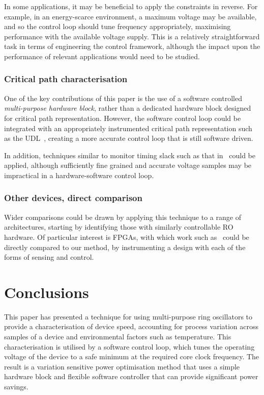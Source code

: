 \documentclass[a4paper,twocolumn,DIV=16]{scrartcl}
\begin{document}
In some applications, it may be beneficial to apply the constraints in reverse.
For example, in an energy-scarce environment, a maximum voltage may be
available, and so the control loop should tune frequency appropriately,
maximising performance with the available voltage supply. This is a relatively
straightforward task in terms of engineering the control framework, although the
impact upon the performance of relevant applications would need to be studied.

\subsubsection*{Critical path characterisation}

One of the key contributions of this paper is the use of a software controlled
\emph{multi-purpose hardware block}, rather than a dedicated hardware block
designed for critical path representation. However, the software control loop
could be integrated with an appropriately instrumented critical path
representation such as the UDL~\cite{Ikenaga2011}, creating a more accurate
control loop that is still software driven.

In addition, techniques similar to monitor timing slack such as that
in~\cite{Hsieh2011} could be applied, although sufficiently fine grained and
accurate voltage samples may be impractical in a hardware-software control loop.

\subsubsection*{Other devices, direct comparison}

Wider comparisons could be drawn by applying this technique to a range of
architectures, starting by identifying those with similarly controllable RO
hardware. Of particular interest is FPGAs, with which work such
as~\cite{Nabina2012,Nunez-Yanez2013} could be directly compared to our method,
by instrumenting a design with each of the forms of sensing and control.

\section{Conclusions}
\label{sec:conclusions}

This paper has presented a technique for using multi-purpose ring oscillators to
provide a characterisation of device speed, accounting for process variation
across samples of a device and environmental factors such as temperature. This
characterisation is utilised by a software control loop, which tunes the
operating voltage of the device to a safe minimum at the required core clock
frequency. The result is a variation sensitive power optimisation method that
uses a simple hardware block and flexible software controller that can provide
significant power savings.
\end{document}
